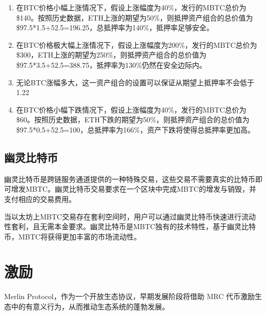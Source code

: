 \documentclass{article}
\begin{document}
\begin{enumerate}
    \item 在BTC价格小幅上涨情况下，假设上涨幅度为40\%，发行的MBTC总价为\$140。按照历史数据，ETH上涨的期望为50\%，则抵押资产组合的总价值为\$97.5*1.5+52.5=196.25，总抵押率为140\%，抵押率足够安全。
    \item 在BTC价格极大幅上涨情况下，假设上涨幅度为200\%，发行的MBTC总价为\$300，ETH上涨的期望为250\%，则抵押资产组合的总价值为\$97.5*3.5+52.5=388.75，抵押率为130\%仍然在安全边际内。
    \item 无论BTC涨幅多大，这一资产组合的设置可以保证从期望上抵押率不会低于1.22
    \item 在BTC价格小幅下跌情况下，假设上涨幅度为40\%，发行的MBTC总价为\$60。按照历史数据，ETH下跌的期望为50\%，则抵押资产组合的总价值为\$97.5*0.5+52.5=100，总抵押率为166\%，资产下跌将使得总抵押率更加高。
\end{enumerate}
\subsection{幽灵比特币}
\par 幽灵比特币是跨链服务通道提供的一种特殊交易，这些交易不需要真实的比特币即可增发MBTC。幽灵比特币交易要求在一个区块中完成MBTC的增发与销毁，并支付相应的交易费用。
\par 当以太坊上MBTC交易存在套利空间时，用户可以通过幽灵比特币快速进行流动性套利，且无需本金要求。幽灵比特币是MBTC独有的技术特性，基于幽灵比特币，MBTC将获得更加丰富的市场流动性。
\section{激励}
Merlin Protocol，作为一个开放生态协议，早期发展阶段将借助 MRC 代币激励生态中的有意义行为，从而推动生态系统的蓬勃发展。\\
\end{document}
